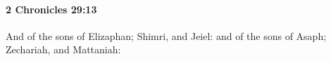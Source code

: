 
		\paragraph{2 Chronicles 29:13} %
			\label{2CHRONICLES-29-13}

			And of the sons of Elizaphan; Shimri, and Jeiel: and of the sons of Asaph; Zechariah, and Mattaniah:


